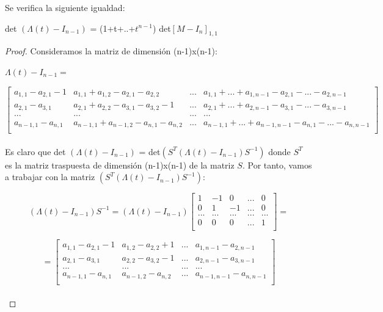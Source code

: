   \newpage
 \begin{lem}
 	Se verifica la siguiente igualdad:
	 \begin{center}
 		det $(\Lambda(t) - I_{n-1})$ = (1+t+..+$ t^{n-1} $) det$[ M - I_{n}] _{1,1} $
	 \end{center}
	 \begin{proof}
	 	Consideramos la matriz de dimensión (n-1)x(n-1):
	            \begin{center}
	            	$ \Lambda(t) - I_{n-1}= $ 
	            \end{center}	           
	           \[\begin{bmatrix}
	           a_{1,1}-a_{2,1}-1 & a_{1,1}+a_{1,2}-a_{2,1}-a_{2,2} & ... &  a_{1,1}+...+a_{1,n-1}-a_{2,1}-...-a_{2,n-1} \\
	           a_{2,1}-a_{3,1} & a_{2,1}+a_{2,2}-a_{3,1}-a_{3,2}-1&... & a_{2,1}+...+a_{2,n-1}-a_{3,1}-...-a_{3,n-1}  \\
	           ... & ... & ... & ... \\	
	           a_{n-1,1}-a_{n,1} & a_{n-1,1}+a_{n-1,2}-a_{n,1}-a_{n,2} & ... & a_{n-1,1}+...+a_{n-1,n-1}-a_{n,1}-...-a_{n,n-1} \\
	           \end{bmatrix}\]\\
	           
	           Es claro que det $(\Lambda(t) - I_{n-1})$ = det$(S^{T}(\Lambda(t) - I_{n-1})S^{-1})$ donde $S^{T}$ es la matriz traspuesta de dimensión (n-1)x(n-1) de la matriz $S$. Por tanto, vamos a trabajar con la matriz $(S^{T}(\Lambda(t) - I_{n-1})S^{-1})$:
	           
	           \[ (\Lambda(t) - I_{n-1})S^{-1} = (\Lambda(t) - I_{n-1}) \begin{bmatrix}
	           1 & -1 & 0 &... & 0 \\
	           0 & 1 & -1 &...  & 0\\
	           ... & ... & ...& ... & ... \\		
	           0 & 0 & 0 & ... & 1\\
	           \end{bmatrix}=\]
	                
	           \[= \begin{bmatrix}
	           a_{1,1}-a_{2,1}-1 & a_{1,2}-a_{2,2}+1 & ... & a_{1,n-1}-a_{2,n-1}  \\
	           a_{2,1}-a_{3,1} & a_{2,2}-a_{3,2}-1&... &  a_{2,n-1}-a_{3,n-1} \\
	           ... & ... & ... & ... \\	
	           a_{n-1,1}-a_{n,1} & a_{n-1,2}-a_{n,2}&... &  a_{n-1,n-1}-a_{n,n-1} \\
	           \end{bmatrix}\]\\
	           

\end{proof}
\end{lem}
